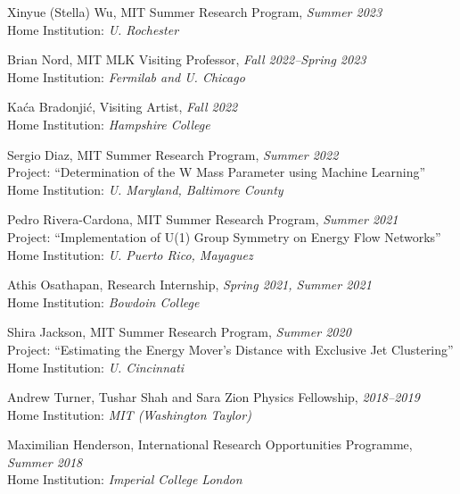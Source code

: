 \bbl

\item Xinyue (Stella) Wu, MIT Summer Research Program, \emph{Summer 2023}
\\ \sh Home Institution: \emph{U. Rochester}

\item Brian Nord, MIT MLK Visiting Professor, \emph{Fall 2022--Spring 2023}
\\ \sh Home Institution: \emph{Fermilab and U. Chicago}

\item Kaća Bradonjić, Visiting Artist, \emph{Fall 2022}
\\ \sh Home Institution: \emph{Hampshire College}

\item Sergio Diaz, MIT Summer Research Program, \emph{Summer 2022}
\\ \sh Project: ``Determination of the W Mass Parameter using Machine Learning''
\\ \sh Home Institution: \emph{U. Maryland, Baltimore County}

\item Pedro Rivera-Cardona, MIT Summer Research Program, \emph{Summer 2021}
\\ \sh Project: ``Implementation of U(1) Group Symmetry on Energy Flow Networks''
\\ \sh Home Institution: \emph{U. Puerto Rico, Mayaguez}

\item Athis Osathapan, Research Internship, \emph{Spring 2021, Summer 2021}
\\ \sh Home Institution: \emph{Bowdoin College}

\item Shira Jackson, MIT Summer Research Program, \emph{Summer 2020}
\\ \sh Project: ``Estimating the Energy Mover’s Distance with Exclusive Jet Clustering''
\\ \sh Home Institution: \emph{U. Cincinnati}

\item Andrew Turner, Tushar Shah and Sara Zion Physics Fellowship, \emph{2018--2019}
\\ \sh Home Institution: \emph{MIT (Washington Taylor)}

\item Maximilian Henderson, International Research Opportunities Programme, \emph{Summer 2018}
\\ \sh Home Institution: \emph{Imperial College London}

